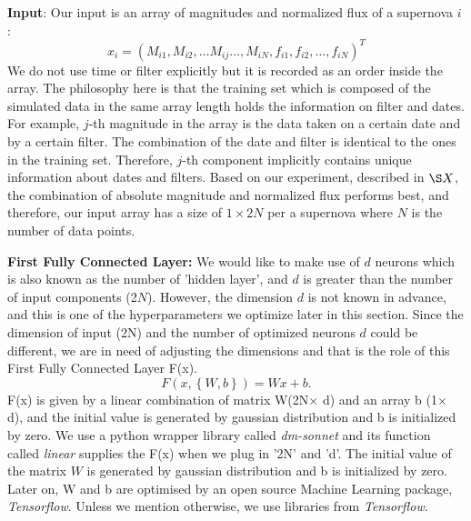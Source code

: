 \documentclass[useamsfonts]{pasj01}
\begin{document}
{\bf Input}: Our input is an array of magnitudes and normalized flux of a supernova $i$ :
\begin{equation}
      x_i = \left( M_{i1}, M_{i2}, \ldots M_{ij} \ldots , M_{iN}, f_{i1}, f_{i2}, \ldots, f_{iN} \right)^T
\end{equation}
We do not use time or filter explicitly but it is recorded as an order inside the array.  The philosophy here is that the training set which is composed of the simulated data in the same array length holds the information on filter and dates.  For example, $j$-th magnitude in the array is the data taken on a certain date and by a certain filter.  The combination of the date and filter is identical to the ones in the training set.  Therefore, $j$-th component implicitly contains unique information about dates and filters.  
Based on our experiment, described in $\S X$, the combination of absolute magnitude and normalized flux performs best, and therefore, our input array has a size of $1\times2N$ per a supernova where $N$ is the number of data points.

{\bf First Fully Connected Layer:}
We would like to make use of $d$ neurons which is also known as the number of 'hidden layer', and $d$ is greater than the number of input components (2$N$).  However, the dimension $d$ is not known in advance, and this is one of the hyperparameters we optimize later in this section.  Since the dimension of input (2N) and the number of optimized neurons $d$ could be different, we are in need of adjusting the dimensions and that is the role of this First Fully Connected Layer F(x).    
\begin{equation}
    F \left(x, \left\{W,b\right\}\right) = W x + b.
\end{equation}
F(x) is given by a linear combination of matrix W(2N$\times$ d) and an array b (1$\times$ d), and the initial value is generated by gaussian distribution and b is initialized by zero.  We use a python wrapper library called {\it dm-sonnet} and its function called {\it linear} supplies the F(x) when we plug in '2N' and 'd'.  The initial value of the matrix $W$ is generated by gaussian distribution and b is initialized by zero.  Later on, W and b are optimised by an open source Machine Learning package, {\it Tensorflow}.  Unless we mention otherwise, we use libraries from {\it Tensorflow}.
\end{document}

